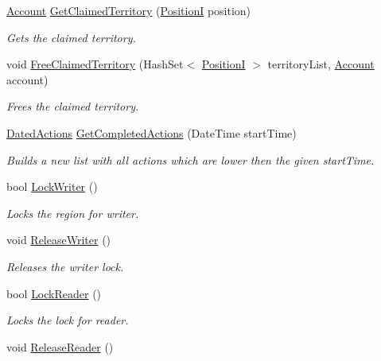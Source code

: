 \begin{DoxyCompactItemize}
\hyperlink{classCore_1_1Models_1_1Account}{Account} \hyperlink{classCore_1_1Models_1_1Region_af7f843d91950f9a871d5e19167f7ee7b}{Get\+Claimed\+Territory} (\hyperlink{classCore_1_1Models_1_1PositionI}{Position\+I} position)
\begin{DoxyCompactList}\small\item\em Gets the claimed territory. \end{DoxyCompactList}\item 
void \hyperlink{classCore_1_1Models_1_1Region_aedea4b5192d17e3b83726cb85b82e106}{Free\+Claimed\+Territory} (Hash\+Set$<$ \hyperlink{classCore_1_1Models_1_1PositionI}{Position\+I} $>$ territory\+List, \hyperlink{classCore_1_1Models_1_1Account}{Account} account)
\begin{DoxyCompactList}\small\item\em Frees the claimed territory. \end{DoxyCompactList}\item 
\hyperlink{classCore_1_1Models_1_1Region_1_1DatedActions}{Dated\+Actions} \hyperlink{classCore_1_1Models_1_1Region_ab1e90f76e173a9a28396f806f274b697}{Get\+Completed\+Actions} (Date\+Time start\+Time)
\begin{DoxyCompactList}\small\item\em Builds a new list with all actions which are lower then the given start\+Time. \end{DoxyCompactList}\item 
bool \hyperlink{classCore_1_1Models_1_1Region_a44181d46f6b2541119734f74cd195365}{Lock\+Writer} ()
\begin{DoxyCompactList}\small\item\em Locks the region for writer. \end{DoxyCompactList}\item 
void \hyperlink{classCore_1_1Models_1_1Region_a377dbd594c64a01e00234efa9d91aa01}{Release\+Writer} ()
\begin{DoxyCompactList}\small\item\em Releases the writer lock. \end{DoxyCompactList}\item 
bool \hyperlink{classCore_1_1Models_1_1Region_a33168014b3d76ef375e03fe123c6e172}{Lock\+Reader} ()
\begin{DoxyCompactList}\small\item\em Locks the lock for reader. \end{DoxyCompactList}\item 
void \hyperlink{classCore_1_1Models_1_1Region_ab4fdcaab29033ad62ac611f74aeeab70}{Release\+Reader} ()

\end{DoxyCompactItemize}
